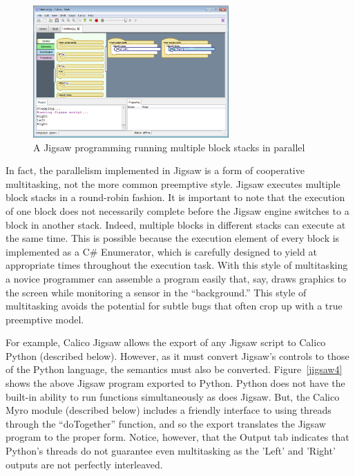 \documentclass[preprint]{sigplanconf}
\begin{document}
\begin{figure}[h!]
  \centering
    \includegraphics[width=75mm]{jigsaw3.eps} 
  \caption{A Jigsaw programming running multiple block stacks in parallel}
  \label{jigsaw3}
\end{figure}

In fact, the parallelism implemented in Jigsaw is a form of
cooperative multitasking, not the more common preemptive style. Jigsaw
executes multiple block stacks in a round-robin fashion. It is
important to note that the execution of one block does not necessarily
complete before the Jigsaw engine switches to a block in another
stack. Indeed, multiple blocks in different stacks can execute at the
same time. This is possible because the execution element of every
block is implemented as a C\# Enumerator, which is carefully designed
to yield at appropriate times throughout the execution task. With this
style of multitasking a novice programmer can assemble a program
easily that, say, draws graphics to the screen while monitoring a
sensor in the ``background.'' This style of multitasking avoids the
potential for subtle bugs that often crop up with a true preemptive
model.

For example, Calico Jigsaw allows the export of any Jigsaw script to
Calico Python (described below). However, as it must convert Jigsaw's
controls to those of the Python language, the semantics must also be
converted. Figure~\ref{jigsaw4} shows the above Jigsaw program exported to
Python. Python does not have the built-in ability to run functions
simultaneously as does Jigsaw. But, the Calico Myro module (described
below) includes a friendly interface to using threads through the
``doTogether'' function, and so the export translates the Jigsaw
program to the proper form. Notice, however, that the Output tab
indicates that Python's threads do not guarantee even multitasking as
the 'Left' and 'Right' outputs are not perfectly interleaved.
\end{document}
